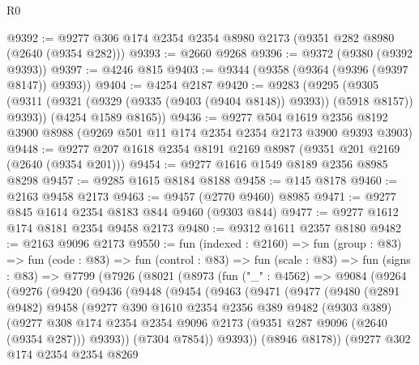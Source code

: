 \begin{lexlean}{R0}
\begin{coremodule}
@9392 := @9277 @306 @174 @2354 @2354 @8980 @2173 (@9351 @282 @8980 (@2640 (@9354 @282)))
@9393 := @2660 @9268
@9396 := @9372 (@9380 (@9392 @9393))
@9397 := @4246 @815
@9403 := @9344 (@9358 (@9364 (@9396 (@9397 @8147)) @9393))
@9404 := @4254 @2187
@9420 := @9283
    (@9295
      (@9305 (@9311 (@9321 (@9329 (@9335 (@9403 (@9404 @8148)) @9393)) (@5918 @8157)) @9393))
      (@4254 @1589 @8165))
@9436 := @9277
    @504
    @1619
    @2356
    @8192
    @3900
    @8988
    (@9269 @501 @11 @174 @2354 @2354 @2173 @3900 @9393 @3903)
@9448 := @9277 @207 @1618 @2354 @8191 @2169 @8987 (@9351 @201 @2169 (@2640 (@9354 @201)))
@9454 := @9277 @1616 @1549 @8189 @2356 @8985 @8298
@9457 := @9285 @1615 @8184 @8188
@9458 := @145 @8178
@9460 := @2163 @9458 @2173
@9463 := @9457 (@2770 @9460) @8985
@9471 := @9277 @845 @1614 @2354 @8183 @844 @9460 (@9303 @844)
@9477 := @9277 @1612 @174 @8181 @2354 @9458 @2173
@9480 := @9312 @1611 @2357 @8180
@9482 := @2163 @9096 @2173
@9550 := fun (indexed : @2160) =>
  fun (group : @83) =>
  fun (code : @83) =>
  fun (control : @83) =>
  fun (scale : @83) =>
  fun (signs : @83) =>
  @7799
    (@7926
      (@8021
        (@8973
          (fun ("_" : @4562) =>
          @9084
            (@9264
              (@9276
                (@9420
                  (@9436
                    (@9448
                      (@9454
                        (@9463
                          (@9471
                            (@9477
                              (@9480
                                (@2891 @9482)
                                @9458
                                (@9277
                                  @390
                                  @1610
                                  @2354
                                  @2356
                                  @389
                                  @9482
                                  (@9303 @389)
                                  (@9277
                                    @308
                                    @174
                                    @2354
                                    @2354
                                    @9096
                                    @2173
                                    (@9351 @287 @9096 (@2640 (@9354 @287)))
                                    @9393))
                                (@7304 @7854))
                              @9393))
                          (@8946 @8178))
                        (@9277
                          @302
                          @174
                          @2354
                          @2354
                          @8269

\end{coremodule}
\end{lexlean}
